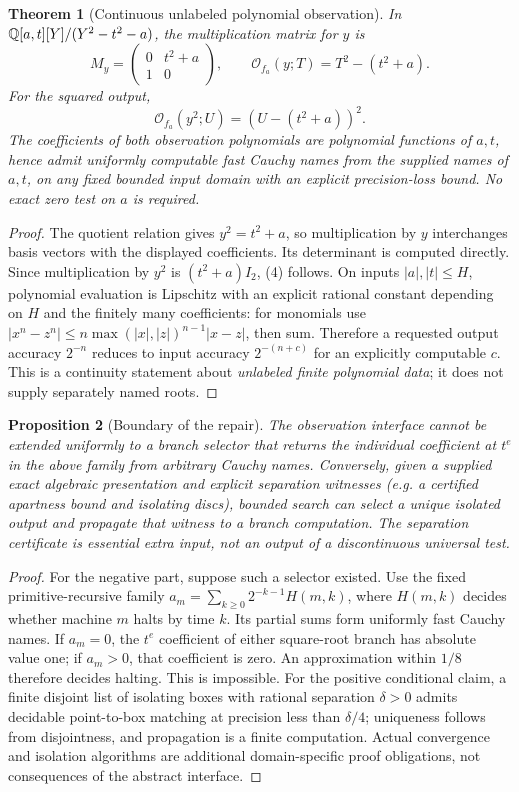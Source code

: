 \documentclass[11pt]{article}
\newtheorem{theorem}{Theorem}[section]
\newtheorem{proposition}[theorem]{Proposition}
\begin{document}
\begin{theorem}[Continuous unlabeled polynomial observation]
In \(\mathbb Q[a,t][Y]/(Y^2-t^2-a)\), the multiplication matrix for \(y\) is
\[M_y=\begin{pmatrix}0&t^2+a\\1&0\end{pmatrix},\qquad
\mathcal O_{f_a}(y;T)=T^2-(t^2+a).\]
For the squared output,
\[\mathcal O_{f_a}(y^2;U)=(U-(t^2+a))^2.\tag{4}\]
The coefficients of both observation polynomials are polynomial functions of \(a,t\), hence admit uniformly computable fast Cauchy names from the supplied names of \(a,t\), on any fixed bounded input domain with an explicit precision-loss bound. No exact zero test on \(a\) is required.
\end{theorem}
\begin{proof}
The quotient relation gives \(y^2=t^2+a\), so multiplication by \(y\) interchanges basis vectors with the displayed coefficients. Its determinant is computed directly. Since multiplication by \(y^2\) is \((t^2+a)I_2\), (4) follows. On inputs \(|a|,|t|\le H\), polynomial evaluation is Lipschitz with an explicit rational constant depending on \(H\) and the finitely many coefficients: for monomials use \(|x^n-z^n|\le n\max(|x|,|z|)^{n-1}|x-z|\), then sum. Therefore a requested output accuracy \(2^{-n}\) reduces to input accuracy \(2^{-(n+c)}\) for an explicitly computable \(c\). This is a continuity statement about \emph{unlabeled finite polynomial data}; it does not supply separately named roots.
\end{proof}

\begin{proposition}[Boundary of the repair]
The observation interface cannot be extended uniformly to a branch selector that returns the individual coefficient at \(t^e\) in the above family from arbitrary Cauchy names. Conversely, given a \emph{supplied} exact algebraic presentation and explicit separation witnesses (e.g. a certified apartness bound and isolating discs), bounded search can select a unique isolated output and propagate that witness to a branch computation. The separation certificate is essential extra input, not an output of a discontinuous universal test.
\end{proposition}
\begin{proof}
For the negative part, suppose such a selector existed. Use the fixed primitive-recursive family
\(a_m=\sum_{k\ge0}2^{-k-1}H(m,k)\), where \(H(m,k)\) decides whether machine \(m\) halts by time \(k\). Its partial sums form uniformly fast Cauchy names. If \(a_m=0\), the \(t^e\) coefficient of either square-root branch has absolute value one; if \(a_m>0\), that coefficient is zero. An approximation within \(1/8\) therefore decides halting. This is impossible. For the positive conditional claim, a finite disjoint list of isolating boxes with rational separation \(\delta>0\) admits decidable point-to-box matching at precision less than \(\delta/4\); uniqueness follows from disjointness, and propagation is a finite computation. Actual convergence and isolation algorithms are additional domain-specific proof obligations, not consequences of the abstract interface.
\end{proof}
\end{document}
